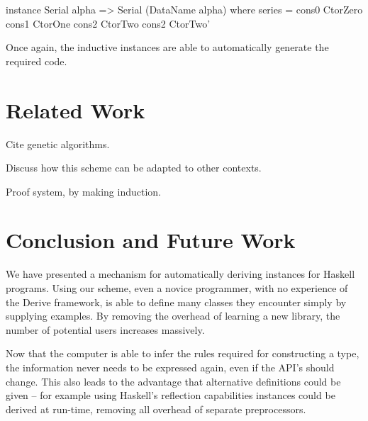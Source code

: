 \documentclass{llncs}
\begin{document}
\begin{code}
instance Serial alpha => Serial (DataName alpha) where
    series = cons0 CtorZero \/ cons1 CtorOne  \/ cons2 CtorTwo  \/ cons2 CtorTwo'
\end{code}

Once again, the inductive instances are able to automatically generate the required code.

\section{Related Work}
\label{sec:related}

Cite genetic algorithms.

Discuss how this scheme can be adapted to other contexts.

Proof system, by making induction.


\section{Conclusion and Future Work}
\label{sec:conclusion}

We have presented a mechanism for automatically deriving instances for Haskell programs. Using our scheme, even a novice programmer, with no experience of the Derive framework, is able to define many classes they encounter simply by supplying examples. By removing the overhead of learning a new library, the number of potential users increases massively.

Now that the computer is able to infer the rules required for constructing a type, the information never needs to be expressed again, even if the API's should change. This also leads to the advantage that alternative definitions could be given -- for example using Haskell's reflection capabilities instances could be derived at run-time, removing all overhead of separate preprocessors.




\end{document}
